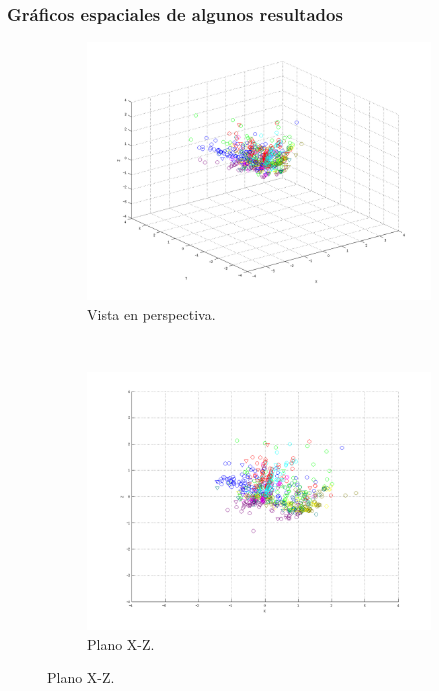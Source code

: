 \documentclass[informe.tex]{subfiles}
\begin{document}
      \subsubsection{Gráficos espaciales de algunos resultados}
	\begin{figure}[H]
        \centering
        \begin{subfigure}[b]{0.49\textwidth}
                \includegraphics[width=\textwidth]{graficos/fold1_criterioParadao_reglaM_alpha0_rep1_0P.png}
                \caption{Vista en perspectiva.}
        \end{subfigure}%
        ~ %
        \begin{subfigure}[b]{0.49\textwidth}
                \includegraphics[width=\textwidth]{graficos/fold1_criterioParadao_reglaM_alpha0_rep1_1XZ.png}
                \caption{Plano X-Z.}
        \end{subfigure}
        

\end{figure}
\end{document}
